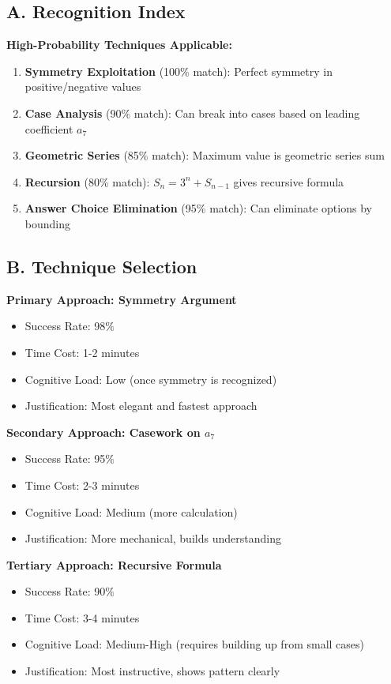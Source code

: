 \documentclass[12pt]{article}
\begin{document}
\begin{conversionbox}
\subsection*{A. Recognition Index}

\textbf{High-Probability Techniques Applicable:}
\begin{enumerate}
    \item \textbf{Symmetry Exploitation} (100\% match): Perfect symmetry in positive/negative values
    \item \textbf{Case Analysis} (90\% match): Can break into cases based on leading coefficient $a_7$
    \item \textbf{Geometric Series} (85\% match): Maximum value is geometric series sum
    \item \textbf{Recursion} (80\% match): $S_n = 3^n + S_{n-1}$ gives recursive formula
    \item \textbf{Answer Choice Elimination} (95\% match): Can eliminate options by bounding
\end{enumerate}

\subsection*{B. Technique Selection}

\textbf{Primary Approach: Symmetry Argument}
\begin{itemize}
    \item Success Rate: 98\%
    \item Time Cost: 1-2 minutes
    \item Cognitive Load: Low (once symmetry is recognized)
    \item Justification: Most elegant and fastest approach
\end{itemize}

\textbf{Secondary Approach: Casework on $a_7$}
\begin{itemize}
    \item Success Rate: 95\%
    \item Time Cost: 2-3 minutes
    \item Cognitive Load: Medium (more calculation)
    \item Justification: More mechanical, builds understanding
\end{itemize}

\textbf{Tertiary Approach: Recursive Formula}
\begin{itemize}
    \item Success Rate: 90\%
    \item Time Cost: 3-4 minutes
    \item Cognitive Load: Medium-High (requires building up from small cases)
    \item Justification: Most instructive, shows pattern clearly
\end{itemize}


\end{conversionbox}
\end{document}
